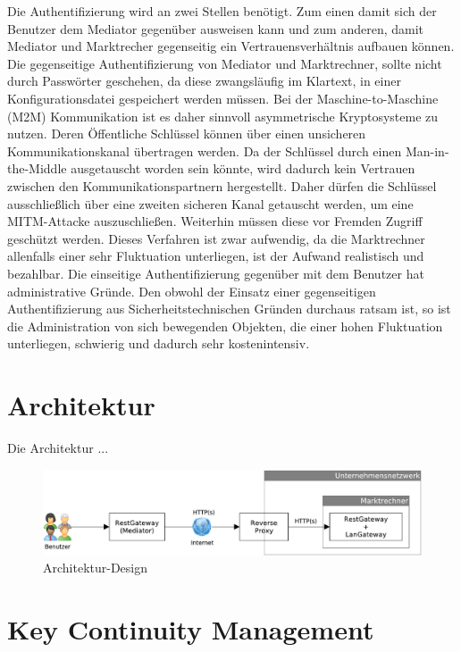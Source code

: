 \documentclass[11pt,a4paper]{report}
\begin{document}
Die Authentifizierung wird an zwei Stellen benötigt. Zum einen damit sich der Benutzer dem Mediator gegenüber ausweisen kann und zum anderen, damit Mediator und Marktrecher gegenseitig ein Vertrauensverhältnis aufbauen können. Die gegenseitige Authentifizierung von Mediator und Marktrechner, sollte nicht durch Passwörter geschehen, da diese zwangsläufig im Klartext, in einer Konfigurationsdatei gespeichert werden müssen. Bei der Maschine-to-Maschine (M2M) Kommunikation ist es daher sinnvoll asymmetrische Kryptosysteme zu nutzen. Deren Öffentliche Schlüssel können über einen unsicheren Kommunikationskanal übertragen werden. Da der Schlüssel durch einen Man-in-the-Middle ausgetauscht worden sein könnte, wird dadurch kein Vertrauen zwischen den Kommunikationspartnern hergestellt. Daher dürfen die Schlüssel ausschließlich über eine zweiten sicheren Kanal getauscht werden, um eine MITM-Attacke auszuschließen. Weiterhin müssen diese vor Fremden Zugriff geschützt werden. Dieses Verfahren ist zwar aufwendig, da die Marktrechner allenfalls einer sehr Fluktuation unterliegen, ist der Aufwand realistisch und bezahlbar. Die einseitige Authentifizierung gegenüber mit dem Benutzer hat administrative Gründe. Den obwohl der Einsatz einer gegenseitigen Authentifizierung aus Sicherheitstechnischen Gründen durchaus ratsam ist, so ist die Administration von sich bewegenden Objekten, die einer hohen Fluktuation unterliegen, schwierig und dadurch sehr kostenintensiv.

\section{Architektur}

Die Architektur ...

\begin{figure}[htbp]
\centering
\includegraphics[scale=0.66]{images/design_architekture.pdf}
\caption{Architektur-Design}
\label{fig:dfd_http_leg}
\end{figure}

\section{Key Continuity Management}
\end{document}
